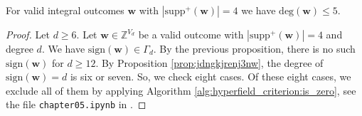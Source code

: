 \begin{theorem}\label{thm:main-result-32432432432nkdnjkfd}
    For valid integral outcomes \( \mathbf w \) with \( |\mathrm{supp}^+(\mathbf w)| = 4 \) we have \( \mathrm{deg}(\mathbf w) \leq 5 \).
\end{theorem}

\begin{proof}
    Let \( d \geq 6 \).
    Let \( \mathbf{w} \in \mathbb{Z}^{V_d} \) be a valid outcome with \( |\mathrm{supp}^+(\mathbf w)| = 4 \) and degree \( d \). We have \( \mathrm{sign}(\mathbf{w}) \in \Gamma_d \). By the previous proposition, there is no such \( \mathrm{sign}(\mathbf{w}) \) for \( d \geq 12 \). By Proposition \ref{prop:jdngkjrenj3nw}, the degree of \( \mathrm{sign}(\mathbf{w}) = d \) is six or seven. So, we check eight cases. Of these eight cases, we exclude all of them by applying Algorithm \ref{alg:hyperfield_criterion:is_zero}, see the file \texttt{chapter05.ipynb} in \cite{ducrepo}.
\end{proof}